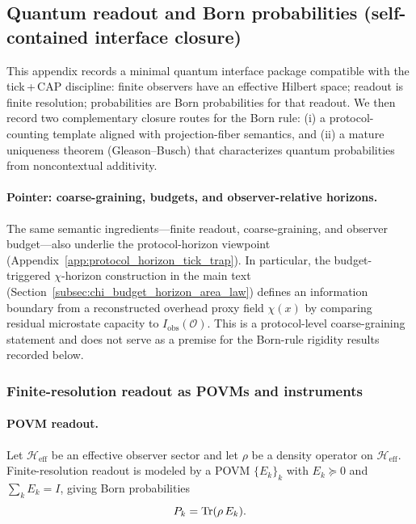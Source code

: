 \subsection{Quantum readout and Born probabilities (self-contained interface closure)}
\label{app:quantum_measurement_born}

This appendix records a minimal quantum interface package compatible with the tick\,+\,CAP discipline:
finite observers have an effective Hilbert space; readout is finite resolution; probabilities are Born probabilities for that readout.
We then record two complementary closure routes for the Born rule:
(i) a protocol-counting template aligned with projection-fiber semantics, and
(ii) a mature uniqueness theorem (Gleason--Busch) that characterizes quantum probabilities from noncontextual additivity.

\paragraph{Pointer: coarse-graining, budgets, and observer-relative horizons.}
\InterfaceTag The same semantic ingredients---finite readout, coarse-graining, and observer budget---also underlie the protocol-horizon viewpoint (Appendix~\ref{app:protocol_horizon_tick_trap}).
In particular, the budget-triggered $\chi$-horizon construction in the main text (Section~\ref{subsec:chi_budget_horizon_area_law}) defines an information boundary from a reconstructed overhead proxy field $\chi(x)$ by comparing residual microstate capacity to $I_{\mathrm{obs}}(\mathcal O)$.
This is a protocol-level coarse-graining statement and does not serve as a premise for the Born-rule rigidity results recorded below.

\subsubsection{Finite-resolution readout as POVMs and instruments}
\label{subsec:z128_povm_instruments}

\paragraph{POVM readout.}
Let $\mathcal{H}_{\mathrm{eff}}$ be an effective observer sector and let $\rho$ be a density operator on $\mathcal{H}_{\mathrm{eff}}$.
Finite-resolution readout is modeled by a POVM $\{E_k\}_k$ with $E_k\succeq 0$ and $\sum_k E_k=I$, giving Born probabilities
\begin{equation}
\label{eq:z128_born_povm}
P_k=\mathrm{Tr}(\rho\,E_k).
\end{equation}

